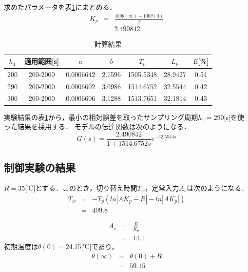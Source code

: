 \documentclass[12pt]{jsarticle}
\begin{document}
求めたパラメータを表\ref{Experiment_ab}にまとめる．
\begin{eqnarray}
  \label{K_p}
  K_p &=& \frac{100 \theta(\infty)- 100 \theta(0)}{A} \\
      &=& 2.490842
\end{eqnarray}
\begin{table}[tb]
  \label{Experiment_ab}
  \caption{計算結果}
  \begin{tabular}{|c|c|c|c|c|c|c|} \hline
    $h_1$ & 適用範囲[s] & $a$ & $b$ & $T_p$ & $L_p$ & $E$[\%] \\ \hline \hline
    200 & 200-2000 & 0.0006642 & 2.7596 & 1505.5348 &  28.9427 & 0.54 \\ \hline
    290 & 200-2000 & 0.0006602 & 3.0986 & 1514.6752 &  32.5544 & 0.42 \\ \hline
    300 & 200-2000 & 0.0006606 & 3.1288 & 1513.7651 &  32.1814 & 0.43 \\ \hline
  \end{tabular}
\end{table}
実験結果の表\ref{Experiment_ab}から，最小の相対誤差を取ったサンプリング周期$h_1=290$[s]を使った結果を採用する．
モデルの伝達関数は次のようになる．
\begin{equation}
  \label{transform_result}
  G(s) = \frac{2.490842}{1+1514.6752s}e^{-32.5544s}
\end{equation}

\subsection{制御実験の結果}
$R=35$[℃]とする．このとき，切り替え時間$T_w$，定常入力$A_s$は次のようになる．
\begin{eqnarray}
  \label{T_w}
  T_w &=& -T_p (ln|A K_p - R| - ln| A K_p|) \\
      &=& 499.8
\end{eqnarray}

\begin{eqnarray}
  \label{A_s}
  A_s &=& \frac{R}{K_p} \\
      &=& 14.1
\end{eqnarray}
初期温度は$\theta(0)=$24.15[℃]であり，
\begin{eqnarray}
  \label{}
  \theta(\infty) &=& \theta(0) + R\\
  &=& 59.15
\end{eqnarray}
\end{document}
